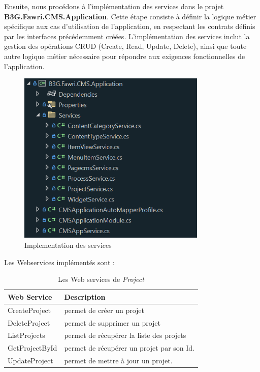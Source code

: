 Ensuite, nous procédons à l'implémentation des services dans le projet \textbf{B3G.Fawri.CMS.Application}. Cette étape consiste à définir la logique métier spécifique aux cas d'utilisation de l'application, en respectant les contrats définis par les interfaces précédemment créées. L'implémentation des services inclut la gestion des opérations CRUD (Create, Read, Update, Delete), ainsi que toute autre logique métier nécessaire pour répondre aux exigences fonctionnelles de l'application.

\begin{figure}[H]
    \centering
    \includegraphics[width=9cm]{Figures/services impl.PNG}
    \caption{Implementation des services}
\end{figure}


Les Webservices implémentés sont :


\begin{table}[H]
    \centering
    \begin{tabular}{|m{5cm}|m{10cm}|}
        \hline
        \textbf{Web Service} & \textbf{Description}                      \\
        \hline
        CreateProject        & permet de créer un projet                 \\
        \hline
        DeleteProject        & permet de supprimer un projet             \\
        \hline
        ListProjects         & permet de récupérer la liste des projets  \\
        \hline
        GetProjectById       & permet de récupérer un projet par son Id. \\
        \hline
        UpdateProject        & permet de mettre à jour un projet.        \\
        \hline
    \end{tabular}
    \caption{Les Web services de \textit{Project}}
\end{table}



